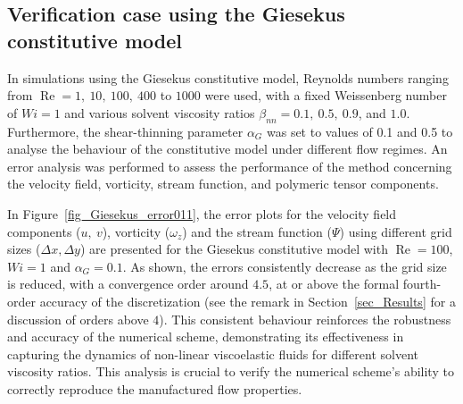 \documentclass[preprint, 12pt]{elsarticle}
\begin{document}
\subsection{Verification case using the Giesekus constitutive model}
\label{subsec_giesekus}

In simulations using the Giesekus constitutive model, Reynolds numbers ranging from $\operatorname{Re} = 1,\ 10,\ 100,\ 400$ to $1000$ were used, with a fixed Weissenberg number of $Wi = 1$ and various solvent viscosity ratios $\beta_{nn} = 0.1,\ 0.5,\ 0.9$, and $1.0$. Furthermore, the shear-thinning parameter $\alpha_G$ was set to values of 0.1 and 0.5 to analyse the behaviour of the constitutive model under different flow regimes. An error analysis was performed to assess the performance of the method concerning the velocity field, vorticity, stream function, and polymeric tensor components.

In Figure~\ref{fig_Giesekus_error011}, the error plots for the velocity field components ($u,~v$), vorticity ($\omega_z$) and the stream function ($\Psi$) using different grid sizes ($\Delta x, \Delta y$) are presented for the Giesekus constitutive model with $\operatorname{Re} = 100$, $Wi = 1$ and $\alpha_G = 0.1$. As shown, the errors consistently decrease as the grid size is reduced, with a convergence order around $4.5$, at or above the formal fourth-order accuracy of the discretization (see the remark in Section~\ref{sec_Results} for a discussion of orders above $4$). This consistent behaviour reinforces the robustness and accuracy of the numerical scheme, demonstrating its effectiveness in capturing the dynamics of non-linear viscoelastic fluids for different solvent viscosity ratios. This analysis is crucial to verify the numerical scheme's ability to correctly reproduce the manufactured flow properties.
\end{document}
